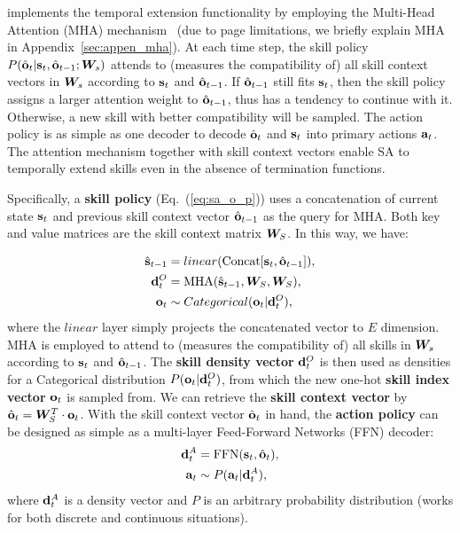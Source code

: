 implements the temporal extension functionality by employing the
Multi-Head Attention (MHA) mechanism~\cite{vaswani2017attention}
(due to page limitations, we briefly explain MHA in
Appendix~\ref{sec:appen_mha}). At each time step, the skill
policy $P(\hat{{\mathbf{o}}}_t|{\mathbf{s}}_t,\hat{{\mathbf{o}}}_{t-1};{\bm{W}}_s)$ attends to
(measures the compatibility of) all skill context vectors in
${\bm{W}}_s$ according to ${\mathbf{s}}_t$ and $\hat{{\mathbf{o}}}_{t-1}$. If
$\hat{{\mathbf{o}}}_{t-1}$ still fits ${\mathbf{s}}_t$, then the skill policy
assigns a larger attention weight to $\hat{{\mathbf{o}}}_{t-1}$, thus has
a tendency to continue with it. Otherwise, a new skill with
better compatibility will be sampled. The action policy is as
simple as one decoder to decode $\hat{{\mathbf{o}}}_t$ and ${\mathbf{s}}_t$ into
primary actions ${\mathbf{a}}_t$. The attention mechanism together with
skill context vectors enable SA to temporally extend skills even
in the absence of termination functions.

Specifically, a \textbf{skill policy} (Eq.~(\ref{eq:sa_o_p}))
uses a concatenation of current state ${\mathbf{s}}_t$ and previous skill
context vector $\hat{{\mathbf{o}}}_{t-1}$ as the query for MHA. Both key
and value matrices are the skill context matrix ${\bm{W}}_S$. In this
way, we have:

\begin{align}
  \label{eq:sa_net_skill_concat}
  \hat{{\mathbf{s}}}_{t-1} &= linear(\text{Concat}[{\mathbf{s}}_t,\hat{{\mathbf{o}}}_{t-1}]),\\
  \label{eq:sa_net_skill_mha}
  {\mathbf{d}}^O_t &= \text{MHA}(\hat{{\mathbf{s}}}_{t-1},{\bm{W}}_S,{\bm{W}}_S),\\
  \label{eq:sa_net_skill_sample}
  {\mathbf{o}}_t &\sim Categorical({\mathbf{o}}_t|{\mathbf{d}}^O_t),
\end{align}
where the $linear$ layer simply projects the concatenated vector
to $E$ dimension. MHA is employed to attend to (measures the
compatibility of) all skills in ${\bm{W}}_s$ according to ${\mathbf{s}}_t$ and
$\hat{{\mathbf{o}}}_{t-1}$. The \textbf{skill density vector} ${\mathbf{d}}^O_t$
is then used as densities for a Categorical distribution
$P({\mathbf{o}}_t|{\mathbf{d}}^O_t)$, from which the new one-hot \textbf{skill
  index vector} ${\mathbf{o}}_t$ is sampled from. We can retrieve the
\textbf{skill context vector} by $\hat{{\mathbf{o}}}_t =
{\bm{W}}_S^T\cdot{\mathbf{o}}_t$. With the skill context vector $\hat{{\mathbf{o}}}_t$
in hand, the \textbf{action policy} can be designed as simple as
a multi-layer Feed-Forward Networks (FFN) decoder:
\begin{align}
  \label{eq:sa_net_action_concat}
  {\mathbf{d}}^A_t &= \text{FFN}({\mathbf{s}}_t,\hat{{\mathbf{o}}}_{t}),\\
  \label{eq:sa_net_action_sample}
  {\mathbf{a}}_t &\sim P({\mathbf{a}}_t|{\mathbf{d}}^A_t),
\end{align}
where ${\mathbf{d}}^A_t$ is a density vector and $P$ is an arbitrary
probability distribution (works for both discrete and continuous
situations).

